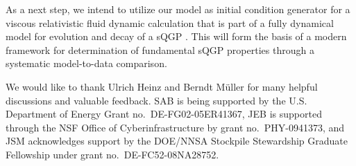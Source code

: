 \documentclass[aps,prc,reprint,amsmath,nofootinbib]{revtex4-1}
\begin{document}
As a next step, we intend to utilize our model as initial condition generator for a viscous relativistic fluid dynamic calculation that is part of a fully dynamical model for evolution and decay of a sQGP \cite{Shen:2014vra}.
This will form the basis of a modern framework for determination of fundamental sQGP properties through a systematic model-to-data comparison.


We would like to thank Ulrich Heinz and Berndt M\"uller for many helpful discussions and valuable feedback.
SAB is being supported by the U.S. Department of Energy Grant no.~DE-FG02-05ER41367,
JEB is supported through the NSF Office of Cyberinfrastructure by grant no.~PHY-0941373,
and JSM acknowledges support by the DOE/NNSA Stockpile Stewardship Graduate Fellowship under grant no.~DE-FC52-08NA28752.

%

\end{document}
